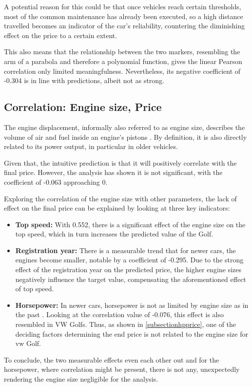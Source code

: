 A potential reason for this could be that once vehicles reach certain thresholds, most of the common maintenance has already been executed, so
a high distance travelled becomes an indicator of the car's reliability, countering the diminishing effect on the price to a certain extent.
\par
This also means that the relationship between the two markers, resembling the arm of a parabola and therefore a polynomial function,
gives the linear Pearson correlation only limited meaningfulness.
Nevertheless, its negative coefficient of -0.304 is in line with predictions, albeit not as strong.

\subsection{Correlation: Engine size, Price}
The engine displacement, informally also referred to as engine size, describes the volume of air and fuel inside an engine's pistons \autocite{EngineDisplacement2024}.
By definition, it is also directly related to its power output, in particular in older vehicles.
\par
Given that, the intuitive prediction is that it will positively correlate with the final price.
However, the analysis has shown it is not significant, with the coefficient of -0.063 approaching 0.
\par
Exploring the correlation of the engine size with other parameters, the lack of effect on the final price can be explained by looking at
three key indicators:
\begin{itemize}
    \item \textbf{Top speed: }
          With 0.552, there is a significant effect of the engine size on the top speed, which in turn increases the predicted value of the Golf.
    \item \textbf{Registration year: }
          There is a measurable trend that for newer cars, the engines become smaller, notable by a coefficient of -0.295.
          Due to the strong effect of the registration year on the predicted price, the higher engine sizes negatively influence the target value,
          compensating the aforementioned effect of top speed.
    \item \textbf{Horsepower: }
          In newer cars, horsepower is not as limited by engine size as in the past \autocite{WhatEngineDisplacement}.
          Looking at the correlation value of -0.076, this effect is also resembled in VW Golfs. Thus, as shown in \autoref{subsectionhpprice}, one of the deciding factors determining the end price 
          is not related to the engine size for \ac{vw} Golf.
\end{itemize}
To conclude, the two measurable effects even each other out and for the horsepower, where correlation might be present, there is not any, unexpectedly rendering the
engine size negligible for the analysis.

